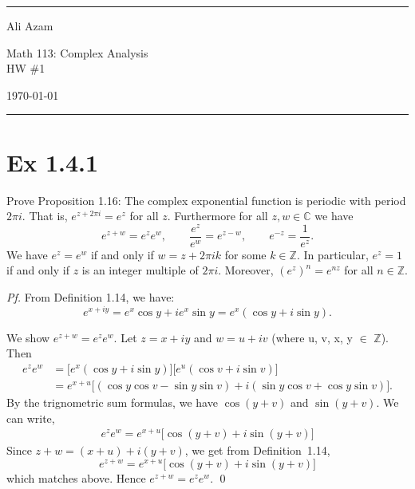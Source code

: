\documentclass[a4paper]{article}
\begin{document}
\hrule\medskip
\begin{minipage}{0.295\textwidth}\raggedright\footnotesize
Ali Azam
\end{minipage}%
\begin{minipage}{0.4\textwidth}\centering
\large Math 113: Complex Analysis\\
\normalsize HW \#1
\end{minipage}%
\begin{minipage}{0.295\textwidth}\raggedleft
\today
\end{minipage}
\medskip\hrule\bigskip


\section*{Ex 1.4.1}

\begin{tcolorbox}[colback=gray!10, colframe=black, boxrule=0.5pt, arc=2mm]
Prove Proposition 1.16: The complex exponential function is periodic with period $2\pi i$. That is, $e^{z+2\pi i} = e^z$ for all $z$. Furthermore for all $z, w \in \mathbb{C}$ we have
\[
e^{z+w} = e^z e^w, \qquad \frac{e^z}{e^w} = e^{z-w}, \qquad e^{-z} = \frac{1}{e^z}.
\]
We have $e^z = e^w$ if and only if $w = z + 2\pi ik$ for some $k \in \mathbb{Z}$. In particular, $e^z = 1$ if and only if $z$ is an integer multiple of $2\pi i$. Moreover, $(e^z)^n = e^{nz}$ for all $n \in \mathbb{Z}$.
\end{tcolorbox}

\textit{Pf.} From Definition 1.14, we have:
\[
e^{x+iy} = e^x\cos y + ie^x\sin y = e^x(\cos y + i\sin y).
\]

\medskip\noindent We show $e^{z+w} = e^z e^w$.
Let $z = x + iy$ and $w = u + iv$ (where u, v, x, y $\in$ $\mathbb{Z}$). Then
\begin{align*}
e^z e^w
  &= \bigl[e^x(\cos y + i\sin y)\bigr]\bigl[e^u(\cos v + i\sin v)\bigr] \\
  &= e^{x+u}\bigl[(\cos y\cos v - \sin y\sin v) + i(\sin y\cos v + \cos y\sin v)\bigr].
\end{align*}
By the trignometric sum formulas, we have $\cos(y+v)$ and $\sin(y+v)$. We can write,
\begin{align*}
e^z e^w = e^{x+u}\bigl[\cos(y+v) + i\sin(y+v)\bigr]
\end{align*}
Since $z + w = (x+u) + i(y+v)$, we get from Definition~1.14,
\[
e^{z+w} = e^{x+u}\bigl[\cos(y+v) + i\sin(y+v)\bigr]
\]
which matches above.  Hence $e^{z+w} = e^z e^w$. \qed
\end{document}
